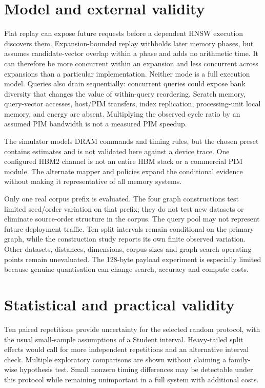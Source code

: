 \documentclass[11pt,a4paper]{report}
\begin{document}
\section{Model and external validity}
Flat replay can expose future requests before a dependent HNSW execution discovers them. Expansion-bounded replay withholds later memory phases, but assumes candidate-vector overlap within a phase and adds no arithmetic time. It can therefore be more concurrent within an expansion and less concurrent across expansions than a particular implementation. Neither mode is a full execution model. Queries also drain sequentially: concurrent queries could expose bank diversity that changes the value of within-query reordering. Scratch memory, query-vector accesses, host/PIM transfers, index replication, processing-unit local memory, and energy are absent. Multiplying the observed cycle ratio by an assumed PIM bandwidth is not a measured PIM speedup.

The simulator models DRAM commands and timing rules, but the chosen preset contains estimates and is not validated here against a device trace. One configured HBM2 channel is not an entire HBM stack or a commercial PIM module. The alternate mapper and policies expand the conditional evidence without making it representative of all memory systems.

Only one real corpus prefix is evaluated. The four graph constructions test limited seed/order variation on that prefix; they do not test new datasets or eliminate source-order structure in the corpus. The query pool may not represent future deployment traffic. Ten-split intervals remain conditional on the primary graph, while the construction study reports its own finite observed variation. Other datasets, distances, dimensions, corpus sizes and graph-search operating points remain unevaluated. The 128-byte payload experiment is especially limited because genuine quantisation can change search, accuracy and compute costs.

\section{Statistical and practical validity}
Ten paired repetitions provide uncertainty for the selected random protocol, with the usual small-sample assumptions of a Student interval. Heavy-tailed split effects would call for more independent repetitions and an alternative interval check. Multiple exploratory comparisons are shown without claiming a family-wise hypothesis test. Small nonzero timing differences may be detectable under this protocol while remaining unimportant in a full system with additional costs.
\end{document}
